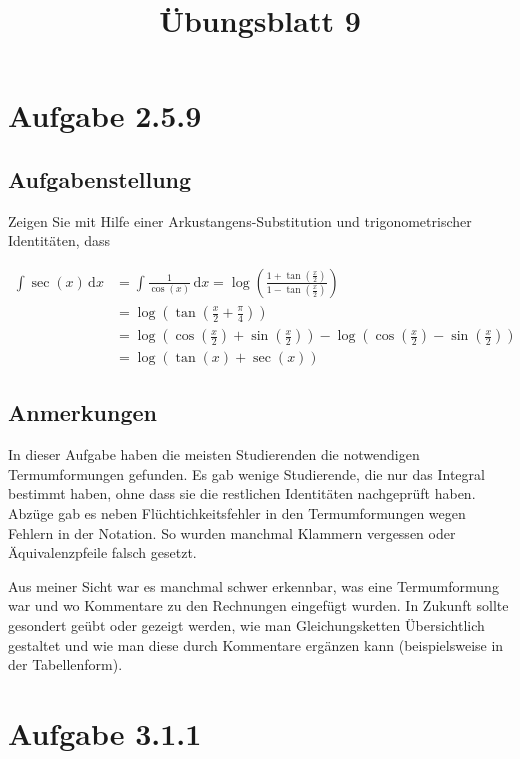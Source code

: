 \documentclass[a4paper]{article}
\title{Übungsblatt 9}
\date{}
\author{}
\newcommand*{\dx}{\,\mathrm{d}x}
\begin{document}
\maketitle

\section{Aufgabe 2.5.9}

\subsection{Aufgabenstellung}

Zeigen Sie mit Hilfe einer Arkustangens-Substitution und trigonometrischer Identitäten, dass

\begin{align}
  \int \operatorname{sec}(x) \dx & = \int \frac 1{\cos(x)} \dx = \log\left(\frac{1+\tan\left(\frac x2\right)}{1-\tan\left(\frac x2\right)}\right) \\
  &= \log\left(\tan\left(\frac x2 + \frac \pi4\right)\right) \\
  &= \log\left(\cos\left(\frac x2\right)+\sin\left(\frac x2\right)\right)- \log\left(\cos\left(\frac x2\right)-\sin\left(\frac x2\right)\right) \\
  &= \log(\tan(x)+\sec(x))
\end{align}

\subsection{Anmerkungen}

In dieser Aufgabe haben die meisten Studierenden die notwendigen Termumformungen gefunden. Es gab wenige Studierende, die nur das Integral bestimmt haben, ohne dass sie die restlichen Identitäten nachgeprüft haben. Abzüge gab es neben Flüchtichkeitsfehler in den Termumformungen wegen Fehlern in der Notation. So wurden manchmal Klammern vergessen oder Äquivalenzpfeile falsch gesetzt.

Aus meiner Sicht war es manchmal schwer erkennbar, was eine Termumformung war und wo Kommentare zu den Rechnungen eingefügt wurden. In Zukunft sollte gesondert geübt oder gezeigt werden, wie man Gleichungsketten Übersichtlich gestaltet und wie man diese durch Kommentare ergänzen kann (beispielsweise in der Tabellenform).

\section{Aufgabe 3.1.1}
\end{document}
